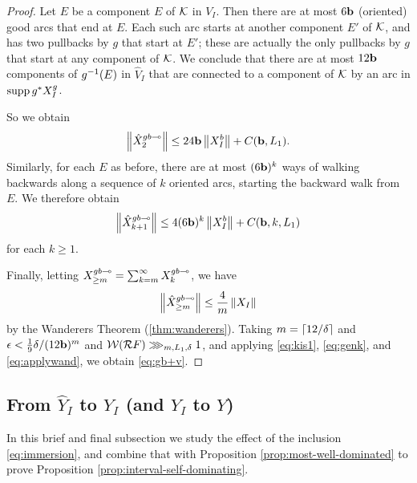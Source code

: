 \begin{proof}
Let $E$ be a component $E$ of $\mathcal K$ in $V_I$.
Then there are at most $6\mathbf b$ (oriented) good arcs that end at $E$.
Each such arc starts at another component $E'$ of $\mathcal K$,
and has two pullbacks by $g$ that start at $E'$; 
these are actually the only pullbacks by $g$ that start at any component of $\mathcal K$.
We conclude that there are at most $12\mathbf b$ components of $g^{-1}(E)$ in $\hat V_I$
that are connected to a component of $\mathcal K$ by an arc in $\operatorname{supp} g^*X_I^g$. 

So we obtain 
\begin{equation}
\left\Vert \hat X^{gb\multimap}_2 \right\Vert \le 24\mathbf b \left\Vert X_I^{b} \right\Vert + C(\mathbf b , L_1).
\end{equation}
Similarly,
for each $E$ as before,
there are at most $(6\mathbf b)^k$ ways of walking backwards along a sequence of $k$ oriented arcs,
starting the backward walk from $E$.
We therefore obtain
\begin{equation} \label{eq:genk}
\left\Vert \hat X^{gb\multimap}_{k+1} \right\Vert \le 4(6\mathbf b )^k \left\Vert X_I^{b} \right\Vert + C(\mathbf b, k, L_1)
\end{equation}
 for each $k\ge 1$. 

Finally,
letting $X^{gb\multimap}_{\ge m} = \sum_{k = m}^\infty X^{gb\multimap}_k$, we have
\begin{equation} \label{eq:applywand}
\left\Vert \hat X^{gb\multimap}_{\ge m} \right\Vert \le \frac{4}{m} \left\Vert X_I \right\Vert
\end{equation}
by the Wanderers Theorem (\ref{thm:wanderers}).
Taking $m = \lceil 12/\delta \rceil$ and $\epsilon < \frac19\delta / (12\mathbf b)^m$ and $\mathcal W(\mathcal R F)\ggg_{m, L_1, \delta} 1$, and applying \eqref{eq:kis1}, \eqref{eq:genk}, and \eqref{eq:applywand},
we obtain \eqref{eq:gb+v}.
\end{proof}



\subsection{From $\hat Y_I$ to $Y_I$ (and $Y_I$ to $Y$)} \label{align:immersion}
In this brief and final subsection we study the effect of the inclusion \eqref{eq:immersion},
and combine that with Proposition \ref{prop:most-well-dominated} to prove Proposition \ref{prop:interval-self-dominating}.

